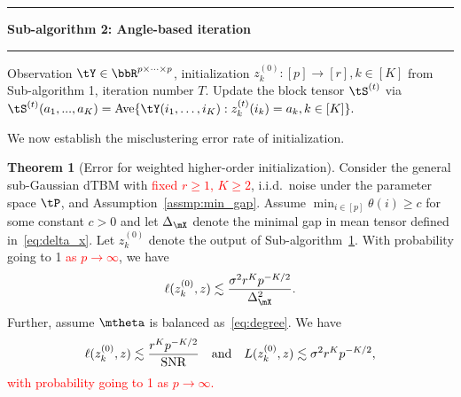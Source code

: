 \documentclass[lettersize,onecolumn,journal]{IEEEtran}
\theoremstyle{definition}
\newtheorem{thm}{Theorem}
\theoremstyle{definition}
\newcommand\Algphase[1]{%
\vspace*{-.7\baselineskip}\Statex\hspace*{\dimexpr-\algorithmicindent-2pt\relax}\rule{\columnwidth}{0.4pt}%
\Statex\hspace*{-\algorithmicindent}\textbf{#1}%
\vspace*{-.7\baselineskip}\Statex\hspace*{\dimexpr-\algorithmicindent-2pt\relax}\rule{\columnwidth}{0.4pt}%
}
\begin{document}
\begin{algorithm}[h!]
\begin{algorithmic}[1]
\Algphase{Sub-algorithm 2: Angle-based iteration}\label{alg:2}
\INPUT Observation $\tY \in \bbR^{p \times \cdots \times p}$, initialization $z^{(0)}_k \colon [p]\to[r], k \in [K]$ from Sub-algorithm 1, iteration number $T$.
\State Update the block tensor $\tS^{(t)}$ via
$\tS^{(t)} (a_1,...,a_K)= \text{Ave} \{\tY(i_1,\ldots,i_K): z^{(t)}_k(i_k) = a_k, k \in [K]\}.$


\EndFor
\EndFor


\end{algorithmic}
\end{algorithm}

We now establish the misclustering error rate of initialization.
{
\color{blue}
\begin{thm}[Error for weighted higher-order initialization]\label{thm:initial} Consider the general sub-Gaussian dTBM with \textcolor{red}{fixed $r \geq 1$, $K \geq 2$}, i.i.d.\ noise under the parameter space $\tP$, and Assumption~\ref{assmp:min_gap}. Assume $\min_{i\in[p]}\theta(i) \geq c$ for some constant $c>0$ and let $\Delta_{\mX}$ denote the minimal gap in mean tensor defined in~\eqref{eq:delta_x}.  Let $ z^{(0)}_k$ denote the output of Sub-algorithm~\hyperref[alg:main]{1}. With probability going to 1 \textcolor{red}{as $p \rightarrow \infty$}, we have
\begin{equation}
    \ell(z^{(0)}_k, z) \lesssim {\sigma^2 r^K p^{-K/2}\over \Delta_{\mX}^2}.
\end{equation}
Further, assume $\mtheta$ is balanced as~\eqref{eq:degree}. We have
\begin{equation}\label{eq:ini}
 \ell(z_k^{(0)}, z) \lesssim {r^K p^{-K/2}\over \text{SNR}} \quad \text{and} \quad L(z^{(0)}_k, z) \lesssim  {\sigma^2 r^K p^{-K/2}},
\end{equation}
\textcolor{red}{with probability going to 1 as $p \rightarrow \infty$.}
\end{thm}
}
\end{document}
